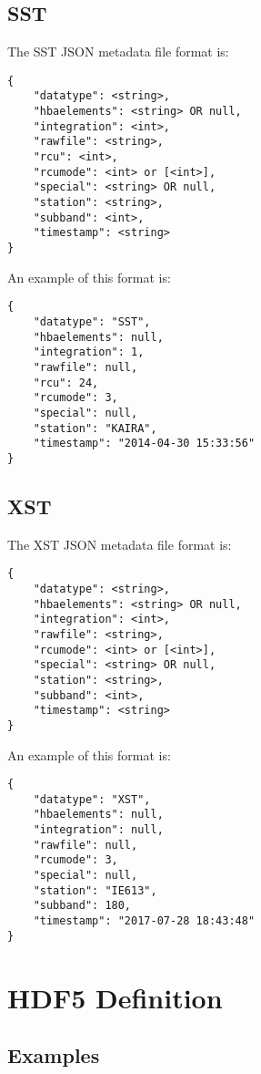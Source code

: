 \documentclass[10pt,a4paper]{article}
\begin{document}
\subsection{SST}

The SST JSON metadata file format is:

\begin{verbatim}
{
    "datatype": <string>,
    "hbaelements": <string> OR null,
    "integration": <int>,
    "rawfile": <string>,
    "rcu": <int>,
    "rcumode": <int> or [<int>],
    "special": <string> OR null,
    "station": <string>,
    "subband": <int>,
    "timestamp": <string>
}
\end{verbatim}

\noindent An example of this format is:

\begin{verbatim}
{
    "datatype": "SST",
    "hbaelements": null,
    "integration": 1,
    "rawfile": null,
    "rcu": 24,
    "rcumode": 3,
    "special": null,
    "station": "KAIRA",
    "timestamp": "2014-04-30 15:33:56"
}
\end{verbatim}

\subsection{XST}

The XST JSON metadata file format is:

\begin{verbatim}
{
    "datatype": <string>,
    "hbaelements": <string> OR null,
    "integration": <int>,
    "rawfile": <string>,
    "rcumode": <int> or [<int>],
    "special": <string> OR null,
    "station": <string>,
    "subband": <int>,
    "timestamp": <string>
}
\end{verbatim}

\noindent An example of this format is:

\begin{verbatim}
{
    "datatype": "XST",
    "hbaelements": null,
    "integration": null,
    "rawfile": null,
    "rcumode": 3,
    "special": null,
    "station": "IE613",
    "subband": 180,
    "timestamp": "2017-07-28 18:43:48"
}
\end{verbatim}

\section{HDF5 Definition}

\subsection{Examples}
\end{document}
